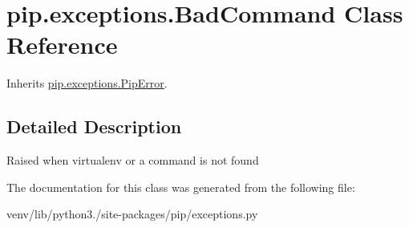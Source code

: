 \hypertarget{classpip_1_1exceptions_1_1_bad_command}{}\section{pip.\+exceptions.\+Bad\+Command Class Reference}
\label{classpip_1_1exceptions_1_1_bad_command}


Inherits \hyperlink{classpip_1_1exceptions_1_1_pip_error}{pip.\+exceptions.\+Pip\+Error}.



\subsection{Detailed Description}
\begin{DoxyVerb}Raised when virtualenv or a command is not found\end{DoxyVerb}
 

The documentation for this class was generated from the following file\+:\begin{DoxyCompactItemize}
\item 
venv/lib/python3./site-\/packages/pip/exceptions.\+py\end{DoxyCompactItemize}
